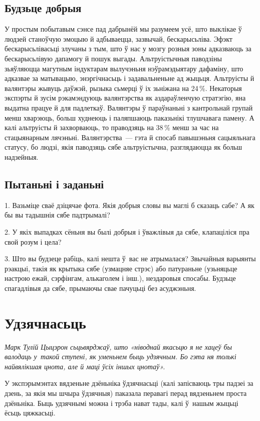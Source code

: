 \subsection*{Будзьце добрыя}

У простым побытавым сэнсе пад дабрынёй мы разумеем усё, што выклікае ў людзей станоўчую эмоцыю й адбываецца, зазвычай, бескарысьліва. Эфэкт бескарысьлівасьці злучаны з тым, што ў нас у мозгу розныя зоны адказваюць за бескарысьлівую дапамогу й пошук выгады. Альтруістычныя паводзіны зьяўляюцца магутным індуктарам вылучэньня нэўрамэдыятару дафаміну, што адказвае за матывацыю, энэргічнасьць і задавальненьне ад жыцьця. Альтруісты й валянтэры жывуць даўжэй, рызыка сьмерці ў іх зьніжана на 24\,\%. Некаторыя экспэрты й зусім рэкамэндуюць валянтэрства як аздараўленчую стратэгію, яна выдатна працуе й для падлеткаў. Валянтэры ў параўнаньні з кантрольнай групай менш хварэюць, больш худнеюць і паляпшаюць паказьнікі тлушчавага памену. А калі альтруісты й захворваюць, то праводзяць на 38\,\% менш за час на стацыянарным лячэньні. Валянтэрства~--- гэта й спосаб павышэньня сацыяльнага статусу, бо людзі, якія паводзяць сябе альтруістычна, разглядаюцца як больш надзейныя.

\subsection*{Пытаньні і заданьні}

1. Вазьміце сваё дзіцячае фота. Якія добрыя словы вы маглі б сказаць сабе? А як бы вы тадышнія сябе падтрымалі?

2. У якіх выпадках сёньня вы былі добрыя і ўважлівыя да сябе, клапаціліся пра свой розум і цела?

3. Што вы будзеце рабіць, калі нешта ў~вас не атрымалася? Звычайныя варыянты рэакцыі, такія як крытыка сябе (узмацняе стрэс) або патураньне (узьняцьце настрою ежай, сэрфінгам, алькаголем і інш.), нездаровыя спосабы. Будзьце спагадлівыя да сябе, прымаючы свае пачуцьці без асуджэньня.


\section{Удзячнасьць}

\emph{Марк Тулій Цыцэрон сьцьвярджаў, што «ніводнай якасьцю я не хацеў бы валодаць у~такой ступені, як уменьнем быць удзячным. Бо гэта ня толькі найвялікшая цнота, але й маці ўсіх іншых цнотаў».}

У экспэрымэнтах вядзеньне дзёньніка ўдзячнасьці (калі запісваюць тры падзеі за дзень, за якія мы шчыра ўдзячныя) паказала перавагі перад вядзеньнем проста дзёньніка. Быць удзячнымі можна і трэба нават тады, калі ў~нашым жыцьці ёсьць цяжкасьці.

